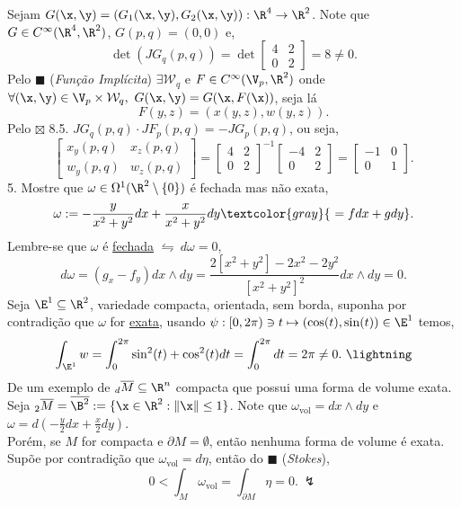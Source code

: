 \textcolor{gris}{
    Sejam \(G(\x,\y) = (G_1(\x,\y), G_2(\x,\y)): \R^4 \to \R^2\). Note que \(G \in C^\infty (\R^4, \R^2) \), \(G(p,q) = (0,0)\) e,
    \[\det (JG_q(p,q)) = \det \begin{bmatrix}
        4 & 2 \\ 
        0 & 2
    \end{bmatrix} = 8 \neq 0.\]  
    Pelo \(\blacksquare\) (\emph{Função Implícita}) \(\exists \mathcal{W}_q\) e \(F\in C^\infty(\V_p, \R^2)\) onde \(\forall (\x, \y) \in \V_p \times \mathcal{W}_q, \ G(\x,\y ) = G(\x, F(\x))\), seja lá
    \[F(y,z) = (x(y,z), w(y,z)).\]  
    Pelo {\scriptsize \(\boxtimes\)} 8.5. \(JG_q(p,q)\cdot JF_p(p,q) = - JG_p(p,q)\), ou seja,
    \[ \begin{bmatrix}
        x_y(p,q) & x_z(p,q) \\
        w_y(p,q) & w_z(p,q) 
    \end{bmatrix}  = \begin{bmatrix}
        4 & 2 \\ 
        0 & 2
    \end{bmatrix}^{-1} \begin{bmatrix}
        -4 & 2 \\ 
        0 & 2
    \end{bmatrix} = \begin{bmatrix}
        -1 & 0 \\ 
        0& 1
    \end{bmatrix}.\]
}
5. Mostre que \(\omega \in \Omega^1(\R^2\setminus \{0\}) \) é fechada mas não exata,  
\[\omega := -\frac{y}{x^2 + y^2}dx + \frac{x}{x^2+y^2} dy \textcolor{gray}{ \ = fdx + gdy}.\] 
\textcolor{gris}{
    Lembre-se que \(\omega \) é \underline{fechada} \(\leftrightharpoons\ d\omega = 0 \), 
    \[ d\omega = (g_x - f_y) dx \wedge dy = \frac{2[x^2+y^2] - 2x^2 - 2y^2}{[x^2+y^2]^2}dx \wedge dy = 0. \] 
    Seja \(\E^1 \subseteq \R^2\), variedade compacta, orientada, sem borda, suponha por contradição que \(\omega \) for \underline{exata}, usando \(\psi: [0,2\pi) \ni t \mapsto (\cos(t), \sin(t)) \in \E^1\) temos,%
    \[\int_{\E^1}w = \int_0^{2\pi} \sin^2(t) + \cos^2(t)  dt = \int_0^{2\pi}  dt = 2\pi \neq 0. \ \lightning\]
}
\hspace{-0.15cm}De um exemplo de \(_d\overline{M}\subseteq \R^n\) compacta que possui uma forma de volume exata. \\ 
\textcolor{gris}{
    Seja \(_2\overline{M} = \overline{\B^2} := \{\x \in \R^2: \|\x\|\leq 1\}\). Note que \(\omega_\text{vol} = dx \wedge dy\) e \(\omega = d(-\frac{y}{2}dx+\frac{x}{2}dy)\). 
}\vspace{0.3cm}\\
Porém, se \(M\) for compacta e \(\partial M = \emptyset \), então nenhuma forma de volume é exata. \\
\textcolor{gris}{
    Supõe por contradição que \(\omega_\text{vol} = d\eta \), então do \(\blacksquare\) (\emph{Stokes}), 
    \[0< \int_M\omega_\text{vol} = \int_{\partial M} \eta = 0. \ \lightning\] 
} 
\newpage

